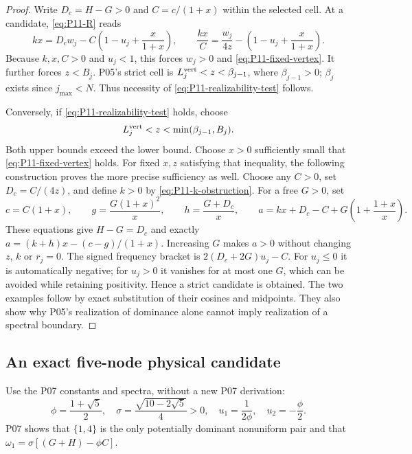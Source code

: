 \begin{proof}
Write $D_c=H-G>0$ and $C=c/(1+x)$ within the selected cell.
At a candidate, \eqref{eq:P11-R} reads
\begin{equation}
 kx=D_cw_j-C\left(1-u_j+\frac{x}{1+x}\right),\qquad
 \frac{kx}{C}=\frac{w_j}{4z}-\left(1-u_j+\frac{x}{1+x}\right).
 \label{eq:P11-k-obstruction}
\end{equation}
Because $k,x,C>0$ and $u_j<1$, this forces $w_j>0$ and
\eqref{eq:P11-fixed-vertex}. It further forces $z<B_j$.
P05's strict cell is
$L_j^{\rm vert}<z<\beta_{j-1}$, where $\beta_{j-1}>0$;
$\beta_j$ exists since $j_{\max}<N$. Thus necessity of
\eqref{eq:P11-realizability-test} follows.

Conversely, if \eqref{eq:P11-realizability-test} holds, choose
\[
 L_j^{\rm vert}<z<\min(\beta_{j-1},B_j).
\]
Both upper bounds exceed the lower bound. Choose $x>0$ sufficiently
small that \eqref{eq:P11-fixed-vertex} holds. For fixed $x,z$
satisfying that inequality, the following construction proves the more
precise sufficiency as well. Choose any $C>0$, set $D_c=C/(4z)$,
and define $k>0$ by \eqref{eq:P11-k-obstruction}. For a free $G>0$,
set
\begin{equation}
 c=C(1+x),\qquad g=\frac{G(1+x)^2}{x},\qquad
 h=\frac{G+D_c}{x},\qquad
 a=kx+D_c-C+G\left(1+\frac{1+x}{x}\right).
 \label{eq:P11-realization}
\end{equation}
These equations give $H-G=D_c$ and exactly
$a=(k+h)x-(c-g)/(1+x)$. Increasing $G$ makes $a>0$
without changing $z$, $k$ or $r_j=0$. The signed frequency bracket
is $2(D_c+2G)u_j-C$. For $u_j\le0$ it is automatically negative;
for $u_j>0$ it vanishes for at most one $G$, which can be avoided
while retaining positivity. Hence a strict candidate is obtained.
The two examples follow by exact substitution of their cosines and
midpoints. They also show why P05's realization of dominance alone
cannot imply realization of a spectral boundary.
\end{proof}

\subsection{An exact five-node physical candidate}
Use the P07 constants and spectra, without a new P07 derivation:
\[
 \phi=\frac{1+\sqrt5}{2},\quad
 \sigma=\frac{\sqrt{10-2\sqrt5}}4>0,\quad
 u_1=\frac1{2\phi},\quad u_2=-\frac\phi2.
\]
P07 shows that $\{1,4\}$ is the only potentially dominant nonuniform
pair and that $\omega_1=\sigma[(G+H)-\phi C]$.

